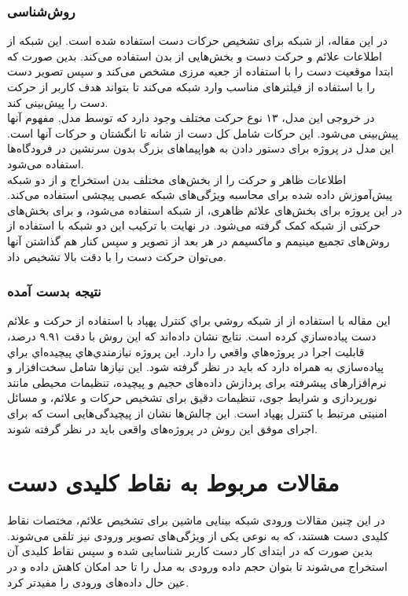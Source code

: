 \subsubsection{روش‌شناسی}
در این مقاله، از شبکه   برای تشخیص حرکات دست استفاده شده است. این شبکه از اطلاعات علائم و حرکت دست و بخش‌هایی از بدن  
استفاده می‌کند. بدین صورت که ابتدا موقعیت دست را با استفاده از جعبه مرزی مشخص می‌کند و سپس تصویر دست را با استفاده از فیلترهای مناسب وارد شبکه  می‌کند تا بتواند هدف کاربر از حرکت دست را پیش‌بینی کند.
\\
در خروجی این مدل، ۱۳ نوع حرکت مختلف وجود دارد که توسط مدل, مفهوم آنها پیش‌بینی می‌شود. این حرکات شامل کل دست از شانه تا انگشتان و حرکات آنها است. این مدل در پروژه برای دستور دادن به هواپیماهای بزرگ بدون سرنشین در فرودگاه‌ها استفاده می‌شود.
\\
 اطلاعات ظاهر و حرکت را از بخش‌های مختلف بدن استخراج و از دو شبکه پیش‌آموزش داده شده برای محاسبه ویژگی‌های شبکه عصبی پیچشی استفاده می‌کند. در این پروژه برای بخش‌های علائم ظاهری، از شبکه  استفاده می‌شود، و برای 
بخش‌های حرکتی از شبکه  کمک گرفته می‌شود.
در نهایت با ترکیب این دو شبکه با استفاده از روش‌های تجمیع مینیمم و ماکسیمم در هر بعد از تصویر و سپس کنار هم گذاشتن آنها می‌توان حرکت دست را با دقت بالا تشخیص داد.

\subsubsection{نتیجه بدست آمده}
اين مقاله با استفاده از از شبكه  روشي براي كنترل پهپاد با استفاده از حركت و علائم دست پياده‌سازي كرده است. نتايج نشان داده‌اند كه اين روش با دقت ۹.۹۱ درصد، قابليت اجرا در پروژه‌هاي واقعي را دارد.  این پروژه نيازمندي‌هاي پيچيده‌اي براي پياده‌سازي به همراه دارد كه بايد در نظر گرفته شود. این نیاز‌ها شامل سخت‌افزار و نرم‌افزار‌های پیشرفته برای پردازش داده‌های حجیم و پیچیده،
 تنظیمات محیطی مانند نورپردازی و شرایط جوی، تنظیمات دقیق برای تشخیص حرکات و علائم، و مسائل امنیتی مرتبط با کنترل پهپاد است. این چالش‌ها نشان از پیچیدگی‌هایی است که برای اجرای موفق این روش در پروژه‌های واقعی باید در نظر گرفته شوند.




\section{مقالات مربوط به نقاط کلیدی دست}
در این چنین مقالات ورودی شبکه بینایی ماشین برای تشخیص علائم، مختصات نقاط کلیدی دست هستند، که به نوعی یکی از ویژگی‌های تصویر ورودی نیز تلقی می‌شوند. بدین صورت که در ابتدای کار دست کاربر شناسایی شده و سپس نقاط کلیدی آن استخراج می‌شوند تا بتوان حجم داده ورودی به مدل را تا حد امکان کاهش داده و در عین حال داده‌های ورودی را مفیدتر کرد.

